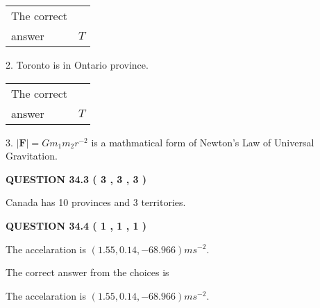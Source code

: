 \documentclass[12pt]{article}
\begin{document}
\noindent\begin{tabular}{|l|l|}\hline The correct & \\
          answer &  %
$T$ \\ \hline \end{tabular}
2.  %
Toronto is in  %
Ontario province.
 
\noindent\begin{tabular}{|l|l|}\hline The correct & \\
          answer &  %
$T$ \\ \hline \end{tabular}
3.  %
$\left| \mathbf{F}\right| =Gm_1m_2r^{-2}$ is a mathmatical form of  %
Newton's Law of Universal Gravitation.
 
 
 
  
\vspace{0.2in}
  
{\textbf{\Large{QUESTION
34.3 
 (           3 ,           3 ,           3 )
}}}
  
  
 
 
\noindent{}
 
 
Canada has  %
10 provinces and  %
3 territories.
 
 
 
 
  
\vspace{0.2in}
  
{\textbf{\Large{QUESTION
34.4 
 (           1 ,           1 ,           1 )
}}}
  
  


 
 
\noindent{}
 
 
The accelaration is $  %
(
1.55,
0.14,
-68.966)
ms^{-2} $.
 
 
 
 
 
 
\noindent{}

The correct answer from the choices is


The accelaration is $  %
(
1.55,
0.14,
-68.966)
ms^{-2} $.
 
 
 
 
 
\noindent{}
\end{document}
